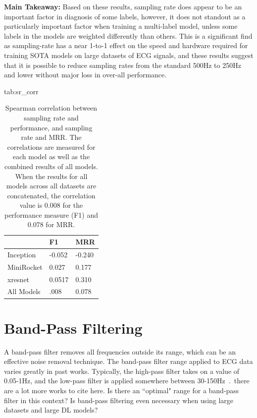 \documentclass[pmlr,twocolumn]{jmlr}%
\begin{document}
\textbf{Main Takeaway:} Based on these results, sampling rate does appear to be an important factor in diagnosis of some labels, however, it does not standout as a particularly important factor when training a multi-label model, unless some labels in the models are weighted differently than others. This is a significant find as sampling-rate has a near 1-to-1 effect on the speed and hardware required for training SOTA models on large datasets of ECG signals, and these results suggest that it is possible to reduce sampling rates from the standard 500Hz to 250Hz and lower without major loss in over-all performance. 

\begin{table}[hbtp]
\floatconts
  {tab:sr_corr}
  {\caption{Spearman correlation between sampling rate and performance, and sampling rate and MRR. The correlations are measured for each model as well as the combined results of all models. When the results for all models across all datasets are concatenated, the correlation value is 0.008 for the performance measure (F1) and 0.078 for MRR. }}
  {\begin{tabular}{|l|l|l|}
  \hline
   & \bfseries F1  & \bfseries MRR \\\hline
  
  Inception  & -0.052 & -0.240  \\
  MiniRocket &  0.027 & 0.177  \\
  xresnet    & 0.0517 & 0.310  \\
  \hline
  All Models & .008 & 0.078\\
  \hline
  \end{tabular}}
\end{table}

\section{Band-Pass Filtering}
\label{sec:BandPass}
A band-pass filter removes all frequencies outside its range, which can be an effective noise removal technique. The band-pass filter range applied to ECG data varies greatly in past works. Typically, the high-pass filter takes on a value of 0.05-1Hz, and the low-pass filter is applied somewhere between 30-150Hz~\cite{uwaechia2021comprehensive,luo2010review}.~{\color{red}there are a lot more works to cite here}. Is there an ``optimal" range for a band-pass filter in this context? Is band-pass filtering even necessary when using large datasets and large DL models?
\end{document}
